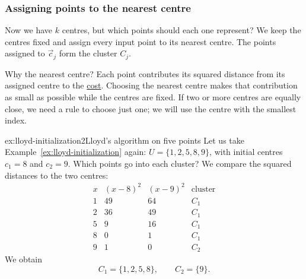 \documentclass[a4paper,12pt,oneside]{report}
\begin{document}
\subsubsection{Assigning points to the nearest centre}
\label{sec:lloyd-assignment}

Now we have $k$ centres, but which points should each one represent?
We keep the centres fixed and assign every input point to its nearest
centre. The points assigned to $\vec c_j$ form the cluster $C_j$.

Why the nearest centre? Each point contributes its squared distance
from its assigned centre to the \hyperref[prob:k-means]{cost}.
Choosing the nearest centre makes that contribution as small as
possible while the centres are fixed. If two or more centres are
equally close, we need a rule to choose just one; we will use the
centre with the smallest index.

\begin{framedexamplepart}{ex:lloyd-initialization}{2}{Lloyd's algorithm on five points}
\label{ex:lloyd-first-clusters}
Let us take Example~\ref{ex:lloyd-initialization} again:
$U=\{1,2,5,8,9\}$, with initial centres $c_1=8$ and $c_2=9$.
Which points go into each cluster? We compare the squared distances
to the two centres:
\[
\begin{array}{c|cc|c}
  x & (x-8)^2 & (x-9)^2 & \text{cluster}\\
  \hline
  1 & 49 & 64 & C_1\\
  2 & 36 & 49 & C_1\\
  5 & 9  & 16 & C_1\\
  8 & 0  & 1  & C_1\\
  9 & 1  & 0  & C_2
\end{array}
\]
We obtain
\[
  C_1=\{1,2,5,8\},\qquad C_2=\{9\}.
\]
\begin{center}
\end{center}
\end{framedexamplepart}
\end{document}
